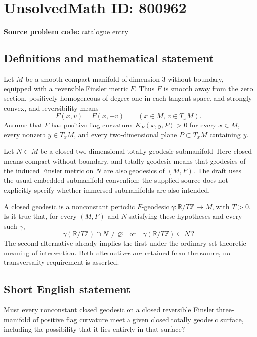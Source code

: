 \documentclass[11pt]{article}
\newcommand{\Z}{\mathbb{Z}}
\newcommand{\R}{\mathbb{R}}
\begin{document}
\section*{UnsolvedMath ID: 800962}
\textbf{Source problem code:} catalogue entry
\subsection{Definitions and mathematical statement}
Let \(M\) be a smooth compact manifold of dimension \(3\) without boundary, equipped with a reversible Finsler metric \(F\). Thus \(F\) is smooth away from the zero section, positively homogeneous of degree one in each tangent space, and strongly convex, and reversibility means
\[
F(x,v)=F(x,-v)\qquad(x\in M,\ v\in T_xM).
\]
Assume that \(F\) has positive flag curvature: \(K_F(x,y,P)>0\) for every \(x\in M\), every nonzero \(y\in T_xM\), and every two-dimensional plane \(P\subset T_xM\) containing \(y\).

Let \(N\subset M\) be a closed two-dimensional totally geodesic submanifold. Here closed means compact without boundary, and totally geodesic means that geodesics of the induced Finsler metric on \(N\) are also geodesics of \((M,F)\). The draft uses the usual embedded-submanifold convention; the supplied source does not explicitly specify whether immersed submanifolds are also intended.

A closed geodesic is a nonconstant periodic \(F\)-geodesic \(\gamma:\R/T\Z\to M\), with \(T>0\). Is it true that, for every \((M,F)\) and \(N\) satisfying these hypotheses and every such \(\gamma\),
\[
\gamma(\R/T\Z)\cap N\ne\varnothing
\quad\text{or}\quad
\gamma(\R/T\Z)\subseteq N\,?
\]
The second alternative already implies the first under the ordinary set-theoretic meaning of intersection. Both alternatives are retained from the source; no transversality requirement is asserted.
\subsection{Short English statement}
Must every nonconstant closed geodesic on a closed reversible Finsler three-manifold of positive flag curvature meet a given closed totally geodesic surface, including the possibility that it lies entirely in that surface?
\end{document}
